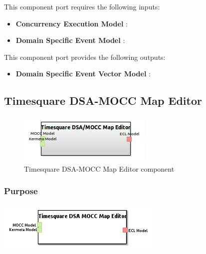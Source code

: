 \documentclass{gemoc} %
\begin{document}
This component port requires the following inputs:
\begin{itemize}
  \item \textbf{Concurrency Execution Model} :
  \item \textbf{Domain Specific Event Model} :
\end{itemize}

This component port provides the following outputs:
\begin{itemize}
  \item \textbf{Domain Specific Event Vector Model} :
\end{itemize}

\subsection{Timesquare DSA-MOCC Map Editor}

\begin{figure}[htp]
	\begin{center}
	\includegraphics*[trim=0.0cm 0.0cm 0cm 0.0cm, clip=true, scale=1.0]{../images/generated/Generated_Timesquare DSA-MOCC Map Editor.jpg}
	\caption{Timesquare DSA-MOCC Map Editor component}
	\end{center}
\end{figure}

\subsubsection{Purpose}

\begin{center}
\includegraphics*[trim=0.0cm 0.0cm 0cm 0.0cm, clip=true]{../images/generated/Generated_Timesquare_DSA-MOCC_Map_Editor.png}
\end{center}
\end{document}
